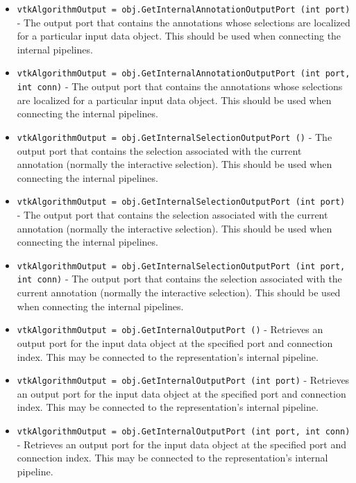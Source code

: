 \begin{itemize}
\item  \verb|vtkAlgorithmOutput = obj.GetInternalAnnotationOutputPort (int port)| -  The output port that contains the annotations whose selections are
 localized for a particular input data object.
 This should be used when connecting the internal pipelines.

\item  \verb|vtkAlgorithmOutput = obj.GetInternalAnnotationOutputPort (int port, int conn)| -  The output port that contains the annotations whose selections are
 localized for a particular input data object.
 This should be used when connecting the internal pipelines.

\item  \verb|vtkAlgorithmOutput = obj.GetInternalSelectionOutputPort ()| -  The output port that contains the selection associated with the
 current annotation (normally the interactive selection).
 This should be used when connecting the internal pipelines.

\item  \verb|vtkAlgorithmOutput = obj.GetInternalSelectionOutputPort (int port)| -  The output port that contains the selection associated with the
 current annotation (normally the interactive selection).
 This should be used when connecting the internal pipelines.

\item  \verb|vtkAlgorithmOutput = obj.GetInternalSelectionOutputPort (int port, int conn)| -  The output port that contains the selection associated with the
 current annotation (normally the interactive selection).
 This should be used when connecting the internal pipelines.

\item  \verb|vtkAlgorithmOutput = obj.GetInternalOutputPort ()| -  Retrieves an output port for the input data object at the specified port
 and connection index. This may be connected to the representation's
 internal pipeline.

\item  \verb|vtkAlgorithmOutput = obj.GetInternalOutputPort (int port)| -  Retrieves an output port for the input data object at the specified port
 and connection index. This may be connected to the representation's
 internal pipeline.

\item  \verb|vtkAlgorithmOutput = obj.GetInternalOutputPort (int port, int conn)| -  Retrieves an output port for the input data object at the specified port
 and connection index. This may be connected to the representation's
 internal pipeline.


\end{itemize}
